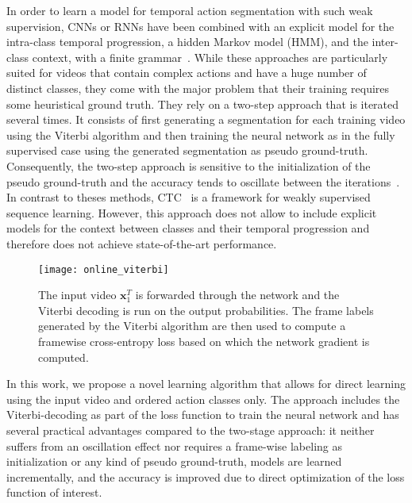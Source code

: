 \documentclass[10pt,twocolumn,letterpaper]{article}
\begin{document}
In order to learn a model for temporal action segmentation with such weak supervision, CNNs or RNNs have been combined 
with an explicit model for the intra-class temporal progression, \eg a hidden Markov model (HMM), and the
inter-class context, \eg with a finite grammar~\cite{richard2017weakly,koller2016deephand,koller2017resign}. While these approaches are particularly suited for videos that contain complex
actions and have a huge number of distinct classes, they come with the major problem
that their training requires some heuristical ground truth. They rely on a two-step approach that is iterated several times. It consists of first generating a segmentation for each training video using the Viterbi algorithm and then training the neural network as in the fully supervised case using the generated segmentation as pseudo ground-truth. Consequently, the two-step approach is sensitive to the initialization of the pseudo ground-truth and the accuracy tends to oscillate between the iterations~\cite{richard2017weakly}. In contrast to theses methods, CTC~\cite{graves2006connectionist} is a framework for weakly supervised sequence learning. However, this approach does not allow to include explicit models for the context between classes and their temporal progression and therefore does not achieve state-of-the-art performance.







\begin{figure}
    \centering
    \texttt{[image: online\_viterbi]}
    \caption{The input video $ \mathbf{x}_1^T $ is forwarded through the network and the
             Viterbi decoding is run on the output probabilities. The frame labels generated
             by the Viterbi algorithm are then used to compute a framewise cross-entropy loss
             based on which the network gradient is computed.}
    \label{fig:onlineViterbi}
\end{figure}

In this work, we propose a novel learning algorithm that allows for direct
learning using the input video and ordered action classes only. The approach includes the
Viterbi-decoding as part of the loss function to train the neural network and has several
practical advantages compared to the two-stage approach:
it neither suffers from an oscillation effect nor requires a frame-wise labeling as
initialization or any kind of pseudo ground-truth, models are learned incrementally,
and the accuracy is improved due to direct optimization of the loss function of interest.
\end{document}
